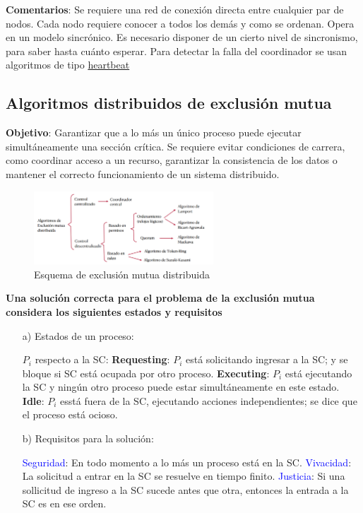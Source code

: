 \textbf{Comentarios}: Se requiere una red de conexión directa entre cualquier par de nodos. Cada nodo requiere conocer a todos los demás y como se ordenan. Opera en un modelo sincrónico. Es necesario disponer de un cierto nivel de sincronismo, para saber hasta cuánto esperar. Para detectar la falla del coordinador se usan algoritmos de tipo \underline{heartbeat}

\subsection{Algoritmos distribuidos de exclusión mutua}

\textbf{Objetivo}: Garantizar que a lo más un único proceso puede ejecutar simultáneamente una sección crítica. Se requiere evitar condiciones de carrera, como coordinar acceso a un recurso, garantizar la consistencia de los datos o mantener el correcto funcionamiento de un sistema distribuido.

\begin{figure}[H]
    \centering
    \includegraphics[width=0.6\textwidth]{img/Clasificacion_algoritmos.png}
    \caption{Esquema de exclusión mutua distribuida}
\end{figure}

\textbf{Una solución correcta para el problema de la exclusión mutua considera los siguientes estados y requisitos}

\begin{itemize}
    \item[a)] Estados de un proceso:
    
    $P_i$ respecto a la SC: \textbf{Requesting}: $P_i$ está solicitando ingresar a la SC; y se bloque si SC está ocupada por otro proceso. \textbf{Executing}: $P_i$ está ejecutando la SC y ningún otro proceso puede estar simultáneamente en este estado. \textbf{Idle}: $P_i$ esstá fuera de la SC, ejecutando acciones independientes; se dice que el proceso está ocioso.

    \item[b)] Requisitos para la solución:
    
    \textcolor{blue}{Seguridad}: En todo momento a lo más un proceso está en la SC. \textcolor{blue}{Vivacidad}: La solicitud a entrar en la SC se resuelve en tiempo finito. \textcolor{blue}{Justicia}: Si una sollicitud de ingreso a la SC sucede antes que otra, entonces la entrada a la SC es en ese orden.
\end{itemize}

